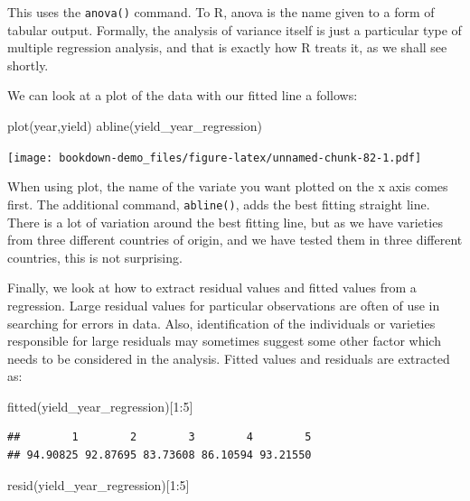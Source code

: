 \documentclass[
]{book}
\newenvironment{Shaded}{\begin{snugshade}}{\end{snugshade}}
\newcommand{\DecValTok}[1]{\textcolor[rgb]{0.00,0.00,0.81}{#1}}
\newcommand{\FunctionTok}[1]{\textcolor[rgb]{0.00,0.00,0.00}{#1}}
\newcommand{\NormalTok}[1]{#1}
\newcommand{\SpecialCharTok}[1]{\textcolor[rgb]{0.00,0.00,0.00}{#1}}
\begin{document}
This uses the \texttt{anova()} command. To R, anova is the name given to a form of tabular output. Formally, the analysis of variance itself is just a particular type of multiple regression analysis, and that is exactly how R treats it, as we shall see shortly.

We can look at a plot of the data with our fitted line a follows:

\begin{Shaded}
\begin{Highlighting}[]
\FunctionTok{plot}\NormalTok{(year,yield)}
\FunctionTok{abline}\NormalTok{(yield\_year\_regression)}
\end{Highlighting}
\end{Shaded}

\texttt{[image: bookdown-demo\_files/figure-latex/unnamed-chunk-82-1.pdf]}

When using plot, the name of the variate you want plotted on the x axis comes first. The additional command, \texttt{abline()}, adds the best fitting straight line. There is a lot of variation around the best fitting line, but as we have varieties from three different countries of origin, and we have tested them in three different countries, this is not surprising.

Finally, we look at how to extract residual values and fitted values from a regression. Large residual values for particular observations are often of use in searching for errors in data. Also, identification of the individuals or varieties responsible for large residuals may sometimes suggest some other factor which needs to be considered in the analysis. Fitted values and residuals are extracted as:

\begin{Shaded}
\begin{Highlighting}[]
\FunctionTok{fitted}\NormalTok{(yield\_year\_regression)[}\DecValTok{1}\SpecialCharTok{:}\DecValTok{5}\NormalTok{]}
\end{Highlighting}
\end{Shaded}

\begin{verbatim}
##        1        2        3        4        5 
## 94.90825 92.87695 83.73608 86.10594 93.21550
\end{verbatim}

\begin{Shaded}
\begin{Highlighting}[]
\FunctionTok{resid}\NormalTok{(yield\_year\_regression)[}\DecValTok{1}\SpecialCharTok{:}\DecValTok{5}\NormalTok{]}
\end{Highlighting}
\end{Shaded}
\end{document}
